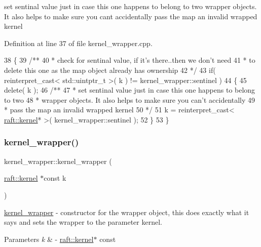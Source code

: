 set sentinal value just in case this one happens to belong to two wrapper objects. It also helps to make sure you can\textquotesingle{}t accidentally pass the map an invalid wrapped kernel

Definition at line 37 of file kernel\+\_\+wrapper.\+cpp.


\begin{DoxyCode}
38 \{\textcolor{comment}{}
39 \textcolor{comment}{    /** }
40 \textcolor{comment}{     * check for sentinal value, if it's there..then we don't need}
41 \textcolor{comment}{     * to delete this one as the map object already has ownership}
42 \textcolor{comment}{     */}
43     \textcolor{keywordflow}{if}( reinterpret\_cast< std::uintptr\_t >( k ) != kernel\_wrapper::sentinel )
44     \{
45         \textcolor{keyword}{delete}( k );\textcolor{comment}{}
46 \textcolor{comment}{        /** }
47 \textcolor{comment}{         * set sentinal value just in case this one happens to belong to two}
48 \textcolor{comment}{         * wrapper objects. It also helps to make sure you can't accidentally}
49 \textcolor{comment}{         * pass the map an invalid wrapped kernel}
50 \textcolor{comment}{         */}
51         k = \textcolor{keyword}{reinterpret\_cast<} \hyperlink{classraft_1_1kernel}{raft::kernel}* \textcolor{keyword}{>}( kernel\_wrapper::sentinel );
52     \}
53 \}
\end{DoxyCode}
\hypertarget{classraft_1_1kernel__wrapper_adecf16d07a9e14109e584b7c4b93bf13}{}\label{classraft_1_1kernel__wrapper_adecf16d07a9e14109e584b7c4b93bf13} 
\subsubsection{\texorpdfstring{kernel\+\_\+wrapper()}{kernel\_wrapper()}\hspace{0.1cm}{\footnotesize\ttfamily [2/2]}}
{\footnotesize\ttfamily kernel\+\_\+wrapper\+::kernel\+\_\+wrapper (\begin{DoxyParamCaption}\item[{\hyperlink{classraft_1_1kernel}{raft\+::kernel} $\ast$const}]{k }\end{DoxyParamCaption})\hspace{0.3cm}{\ttfamily [protected]}}

\hyperlink{classraft_1_1kernel__wrapper}{kernel\+\_\+wrapper} -\/ constructor for the wrapper object, this does exactly what it says and sets the wrapper to the parameter kernel. 
\begin{DoxyParams}{Parameters}
{\em k} & -\/ \hyperlink{classraft_1_1kernel}{raft\+::kernel}$\ast$ const \\
\hline
\end{DoxyParams}


